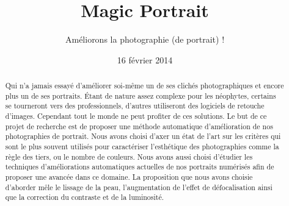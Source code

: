 \documentclass[11pt, french]{report-rd-info}
\begin{document}
\title{Magic Portrait}
\subtitle{Améliorons la photographie (de portrait) !}
\date{16 février 2014}
\begin{abstract}
Qui n'a jamais essayé d'améliorer soi-même un de ses clichés photographiques et encore plus un de ses portraits. Étant de nature assez complexe pour les néophytes, certains se tourneront vers des professionnels, d'autres utiliseront des logiciels de retouche d'images. Cependant tout le monde ne peut profiter de ces solutions.  Le but de ce projet de recherche est de proposer une méthode automatique d'amélioration de nos photographies de portrait. Nous avons choisi d'axer un état de l'art sur les critères qui sont le plus souvent utilisés pour caractériser l'esthétique des photographies comme la règle des tiers, ou le nombre de couleurs. Nous avons aussi choisi d'étudier les techniques d'améliorations automatiques actuelles de nos portraits numérisés afin de proposer une avancée dans ce domaine. La proposition que nous avons choisie d'aborder mêle le lissage de la peau, l'augmentation de l'effet de défocalisation ainsi que la correction du contraste et de la luminosité.
\end{abstract}
\end{document}
